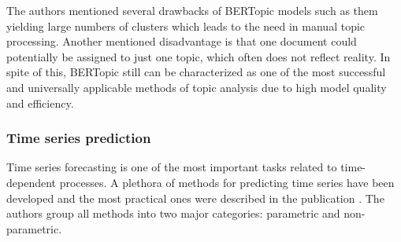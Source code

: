 \documentclass[13pt, a4paper]{article}
\begin{document}
The authors mentioned several drawbacks of BERTopic models such as them yielding large numbers of clusters which leads to the need in manual topic processing. Another mentioned disadvantage is that one document could potentially be assigned to just one topic, which often does not reflect reality. In spite of this, BERTopic still can be characterized as one of the most successful and universally applicable methods of topic analysis due to high model quality and efficiency.

\subsubsection{Time series prediction} \label{tsp}

Time series forecasting is one of the most important tasks related to time-dependent processes. A plethora of methods for predicting time series have been developed and the most practical ones were described in the publication \cite{parmezan2019evaluation}. The authors group all methods into two major categories: parametric and non-parametric.
\end{document}
